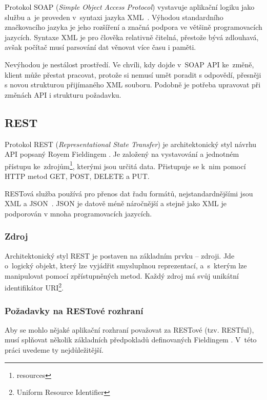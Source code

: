 Protokol SOAP (\textit{Simple Object Access Protocol}) vystavuje aplikační logiku jako službu
a~je proveden v~syntaxi jazyka XML~\cite{xml}. Výhodou standardního značkovacího jazyka je jeho rozšíření
a značná podpora ve většině programovacích jazycích. Syntaxe XML je pro člověka relativně čitelná,
přestože bývá zdlouhavá, avšak počítač musí parsování dat věnovat více času i paměti.

Nevýhodou je nestálost prostředí. Ve chvíli, kdy dojde v~SOAP API ke~změ\-ně, klient může přestat pracovat,
protože si nemusí umět poradit s odpovědí, přesněji s novou strukturou přijímaného XML souboru.
Podobně je potřeba upravovat při změnách API i strukturu požadavku.

 
\subsection{REST}

Protokol REST (\textit{Representational State Transfer}) je architektonický styl návrhu API popsaný Royem Fieldingem \cite{fielding}.
Je založený na vystavování a jednotném přístupu ke~zdrojům\footnote{resources}, kterými jsou určitá data.
Přistupuje se k~nim pomocí HTTP metod GET, POST, DELETE a PUT.

RESTová služba používá pro přenos dat řadu formátů, nejstandardnějšími jsou XML a JSON~\cite{json}.
JSON je datově méně náročnější a stejně jako XML je podporován v mnoha programovacích jazycích.

\subsubsection*{Zdroj}

Architektonický styl REST je postaven na základním prvku -- zdroji. Jde o~logický objekt,
který lze vyjádřit smysluplnou reprezentací, a~s~kterým lze manipulovat pomocí zpřístupněných metod.
Každý zdroj má svůj unikátní identifikátor URI\footnote{Uniform Resource Identifier}.

\subsubsection*{Požadavky na RESTové rozhraní}

Aby se mohlo nějaké aplikační rozhraní považovat za RESTové (tzv. RESTful),
musí splňovat několik základních předpokladů definovaných Fieldingem \cite{fielding}.
V~této práci uvedeme ty nejdůležitější.

